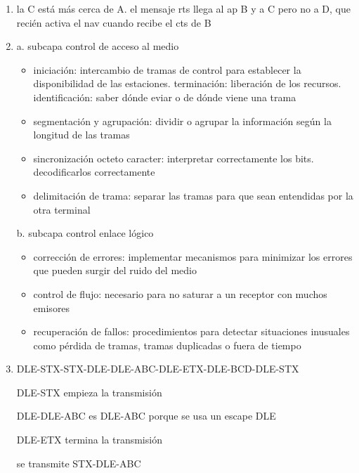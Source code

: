 \documentclass[11pt]{article}
\begin{document}
\begin{enumerate}
\item la C está más cerca de A. el mensaje rts llega al ap B y a C pero no a D, que recién activa el nav cuando recibe el cts de B
\item a. subcapa control de acceso al medio
\begin{itemize}
\item iniciación: intercambio de tramas de control para establecer la disponibilidad de las estaciones. terminación: liberación de los recursos. identificación: saber dónde eviar o de dónde viene una trama
\item segmentación y agrupación: dividir o agrupar la información según la longitud de las tramas
\item sincronización octeto caracter: interpretar correctamente los bits. decodificarlos correctamente
\item delimitación de trama: separar las tramas para que sean entendidas por la otra terminal
\end{itemize}
b. subcapa control enlace lógico
\begin{itemize}
\item corrección de errores: implementar mecanismos para minimizar los errores que pueden surgir del ruido del medio
\item control de flujo: necesario para no saturar a un receptor con muchos emisores
\item recuperación de fallos: procedimientos para detectar situaciones inusuales como pérdida de tramas, tramas duplicadas o fuera de tiempo
\end{itemize}
\item DLE-STX-STX-DLE-DLE-ABC-DLE-ETX-DLE-BCD-DLE-STX

DLE-STX empieza la transmisión

DLE-DLE-ABC es DLE-ABC porque se usa un escape DLE

DLE-ETX termina la transmisión

se transmite STX-DLE-ABC
\end{enumerate}
\end{document}
